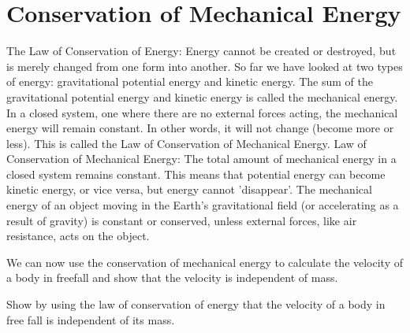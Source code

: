             \section{Conservation of Mechanical Energy}
            \nopagebreak
{} { The Law of Conservation of Energy: Energy cannot be created or destroyed, but is merely changed from one form into another.  } 
        \label{m38786*id68483}So far we have looked at two types of energy: gravitational potential energy and kinetic energy. The sum of the gravitational potential energy and kinetic energy is called the mechanical energy. In a closed system, one where there are no external forces acting, the mechanical energy will remain constant. In other words, it will not change (become more or less). This is called the Law of Conservation of Mechanical Energy. 
 { Law of Conservation of Mechanical Energy: The total amount of mechanical energy in a closed system remains constant.  } 
        \label{m38786*id68519}This means that potential energy can become kinetic energy, or vice versa, but energy cannot 'disappear'. The mechanical energy of an object moving in the Earth's gravitational field (or accelerating as a result of gravity) is constant or conserved, unless external forces, like air resistance, acts on the object.\par 
        \label{m38786*id68525}We can now use the conservation of mechanical energy to calculate the velocity of a body in freefall and show that the velocity is independent of mass.\par 
        \label{m38786*id68529}Show by using the law of conservation of energy that the velocity of a body in free fall is independent of its mass.\par 
\label{m38786*notfhsst!!!underscore!!!id1592}

